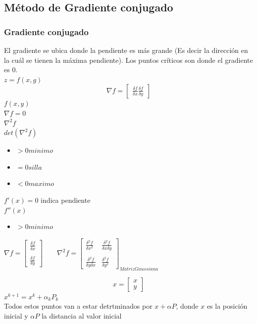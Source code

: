 \subsection{M\'etodo de Gradiente conjugado}
\subsubsection{Gradiente conjugado}
El gradiente se ubica donde la pendiente es m\'as grande (Es decir la direcci\'on en la cu\'al se tienen la m\'axima pendiente). Los puntos cr\'iticos son donde el gradiente es 0.\\
$z=f(x,g)$\\
\begin{displaymath}
\nabla f=\begin{bmatrix}
\frac{\delta f}{\delta x}
\frac{\delta f}{\delta y}
\end{bmatrix}
\end{displaymath}
$f(x,y)$\\
$\nabla f=0$\\
$\nabla ^2f$ \\
$det(\nabla ^2f)$
\begin{itemize}
\item $>0 minimo$
\item $=0 silla$
\item $<0 maximo$
\end{itemize}
$f'(x)=0$ indica pendiente\\
$f''(x)$
\begin{itemize}
\item $>0 minimo$
\end{itemize}
$\nabla f=\begin{bmatrix}
\frac{\delta f}{\delta x} \\
\\
\frac{\delta f}{\delta y} 
\end{bmatrix} \qquad \nabla ^2f=\begin{bmatrix}
\frac{\delta ^2f}{\delta x^2} & \frac{\delta ^2f}{\delta x\delta y}\\
\\
\frac{\delta ^2f}{\delta y\delta x} & \frac{\delta ^2f}{\delta y^2} 
\end{bmatrix}_{Matriz Gaussiana} $ 
\begin{center}
\begin{displaymath}
x=\begin{bmatrix}
x \\ y
\end{bmatrix}
\end{displaymath}
$x^{k+1}= x^k+\alpha_kP_k$\\
Todos estos puntos van a estar detrtminados por $x+\alpha P$, donde $x$ es la posici\'on inicial y $\alpha P$ la distancia al valor inicial\\
\end{center}
